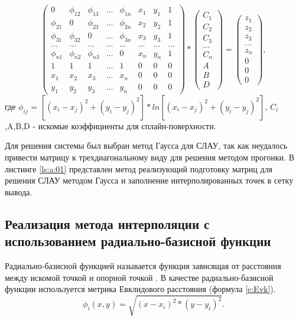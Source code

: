 \begin{equation} \label{e:slau}
\begin{pmatrix}
 0 &  \phi_{12} & \phi_{13} & ... & \phi_{1n} & x_1 & y_1 & 1 \\ 
 \phi_{21} & 0 & \phi_{23} & ... & \phi_{2n} & x_2 & y_2 & 1 \\ 
 \phi_{31} & \phi_{32} & 0 & ... & \phi_{3n} & x_3 & y_3 & 1 \\ 
 ... & ... & ... & ... & ... & ... & ... & ... \\ 
 \phi_{n1} & \phi_{n2} & \phi_{n3} & ... & 0 & x_n & y_n & 1 \\ 
 1 & 1 & 1 & ... & 1 & 0 & 0 & 0 \\ 
 x_1 & x_2 & x_3 & ... & x_n & 0 & 0 & 0\\ 
 y_1 & y_2 & y_3 & ... & y_n & 0 & 0 & 0
\end{pmatrix} * \begin{pmatrix}
C_1\\ 
C_2\\ 
C_3\\ 
...\\ 
C_n\\ 
A\\ 
B\\ 
D
\end{pmatrix} = \begin{pmatrix}
z_1\\ 
z_2\\ 
z_3\\ 
...\\ 
z_n\\ 
0\\ 
0\\ 
0
\end{pmatrix},
\end{equation}
где $\phi_{ij}$ = $[(x_i - x_j)^2 + (y_i - y_j)^2] * ln[(x_i - x_j)^2 + (y_i - y_j)^2]$, $C_i$,A,B,D - искомые коэффициенты для сплайн-поверхности.

Для решения системы был выбран метод Гаусса для СЛАУ, так как неудалось привести матрицу к трехдиагональному виду для решения методом прогонки. В листинге \ref{ls:a:01} представлен метод реализующий подготовку матриц для решения СЛАУ методом Гаусса и заполнение интерполированных точек в сетку вывода.


\subsection{Реализация метода интерполяции с использованием радиально-базисной функции }
Радиально-базисной функцией называется функция зависящая от расстояния между искомой точкой и опорной точкой \cite{27}. В качестве радиально-базисной функции используется метрика Евклидового расстояния (формула \ref{e:Evk}). 
\begin{equation} \label{e:Evk}
\phi_i(x,y) = \sqrt{(x-x_i)^2 * (y-y_i)^2}.
\end{equation}

